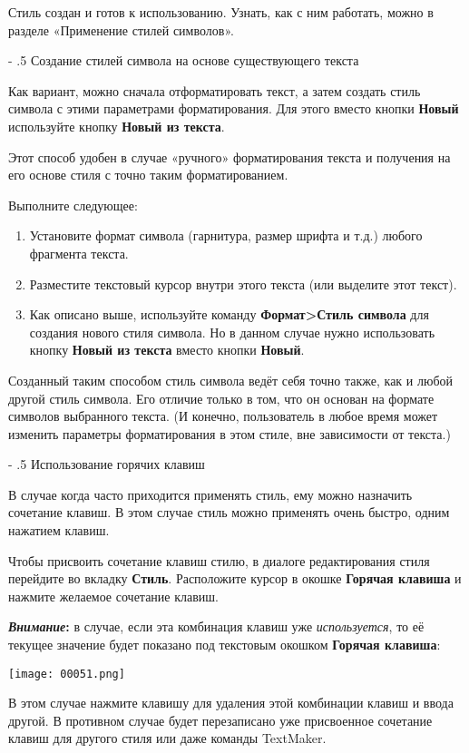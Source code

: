 \documentclass[a4paper,10pt]{article}
\makeatletter
\renewcommand\paragraph{%
   \@startsection{paragraph}{4}{0mm}%
      {-\baselineskip}%
      {.5\baselineskip}%
      {\normalfont\normalsize\bfseries}}
\makeatother
\begin{document}
Стиль создан и готов к использованию. Узнать, как с ним работать, можно в разделе «Применение стилей символов».

\paragraph{Создание стилей символа на основе существующего текста}

Как вариант, можно сначала отформатировать текст, а затем создать стиль символа с этими параметрами форматирования. Для этого вместо кнопки \textbf{Новый} используйте кнопку \textbf{Новый из текста}.

Этот способ удобен в случае «ручного» форматирования текста и получения на его основе стиля с точно таким форматированием.

Выполните следующее:
\begin{enumerate}
 \item Установите формат символа (гарнитура, размер шрифта и т.д.) любого фрагмента текста.
 \item Разместите текстовый курсор внутри этого текста (или выделите этот текст).
 \item Как описано выше,  используйте команду \textbf{Формат>Стиль символа} для создания нового стиля символа. Но в данном случае нужно использовать кнопку \textbf{Новый из текста} вместо кнопки \textbf{Новый}.
 \end{enumerate}

Созданный таким способом стиль символа ведёт себя точно также, как и любой другой стиль символа. Его отличие только в том, что он основан на формате символов выбранного текста. (И конечно, пользователь в любое время может изменить параметры форматирования в этом стиле, вне зависимости от текста.)

\paragraph{Использование горячих клавиш}

В случае когда часто приходится применять стиль, ему можно назначить сочетание клавиш. В этом случае стиль можно применять очень быстро, одним нажатием клавиш.

Чтобы присвоить сочетание клавиш стилю, в диалоге редактирования стиля перейдите во вкладку \textbf{Стиль}. Расположите курсор в окошке \textbf{Горячая клавиша} и нажмите желаемое сочетание клавиш.

\begin{mdframed}[backgroundcolor=blue!10]
\textbf{\textit{Внимание}:} в случае, если эта комбинация клавиш уже \textit{используется}, то её текущее значение будет показано под текстовым окошком \textbf{Горячая клавиша}:

\texttt{[image: 00051.png]}

В этом случае нажмите клавишу  для удаления этой комбинации клавиш и ввода другой. В противном случае будет перезаписано уже присвоенное сочетание клавиш для другого стиля или даже команды TextMaker.
\end{mdframed}
\end{document}

